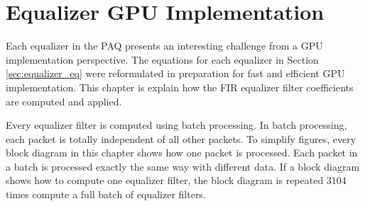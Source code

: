 \chapter{Equalizer GPU Implementation}
\label{chap:equalizers_in_gpus}
Each equalizer in the PAQ presents an interesting challenge from a GPU implementation perspective.
The equations for each equalizer in Section \ref{sec:equalizer_eq} were reformulated in preparation for fast and efficient GPU implementation.
This chapter is explain how the FIR equalizer filter coefficients are computed and applied.

Every equalizer filter is computed using batch processing.
In batch processing, each packet is totally independent of all other packets.
To simplify figures, every block diagram in this chapter shows how one packet is processed.
Each packet in a batch is processed exactly the same way with different data.
If a block diagram shows how to compute one equalizer filter, the block diagram is repeated $3104$ times compute a full batch of equalizer filters.

